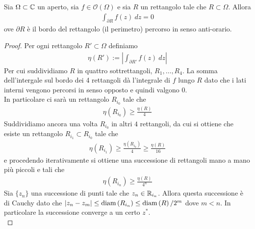 \begin{theorem}[di Goursat]
	\label{thr:groursat}
	Sia $\Omega \subset \mathbb{C}$ un aperto, sia $f \in \mathcal{O}(\Omega)$ e sia $R$ un rettangolo tale che $R \subset \Omega$. Allora 
	\begin{equation*}
	\begin{aligned}
		\int_{\partial R} f(z)\ dz = 0
	\end{aligned}
	\end{equation*}
	ove $\partial R$ è il bordo del rettangolo (il perimetro) percorso in senso anti-orario.
\end{theorem}
\begin{proof}
	Per ogni rettangolo $R' \subset \Omega$ definiamo 
	\begin{equation*}
	\begin{aligned}
		\eta(R') := \left| \int_{\partial R'} f(z)\ dz\right|
	\end{aligned}
	\end{equation*}
	Per cui suddividiamo $R$ in quattro sottrettangoli, $R_1, \dots, R_4$. La somma dell'intergale sul bordo dei 4 rettangoli dà l'integrale di $f$ lungo $R$ dato che i lati interni vengono percorsi in senso opposto e quindi valgono $0$. \\
	In particolare ci sarà un rettangolo $R_{i_0}$ tale che 
	\begin{equation*}
	\begin{aligned}	
		\eta(R_{i_0}) \ge \frac{\eta(R)}{4} 
	\end{aligned}
	\end{equation*}
	Suddividiamo ancora una volta $R_{i_0}$ in altri $4$ rettangoli, da cui si ottiene che esiste un rettangolo $R_{i_1} \subset R_{i_0}$ tale che 
	\begin{equation*}
	\begin{aligned}
		\eta(R_{i_1}) \ge \frac{\eta(R_{i_0})}{4} \ge \frac{\eta(R)}{16} 
	\end{aligned}
	\end{equation*}
	e procedendo iterativamente si ottiene una successione di rettangoli mano a mano più piccoli e tali che 
	\begin{equation*}
	\begin{aligned}	
		\eta(R_{i_n}) \ge \frac{\eta(R)}{4^n}
	\end{aligned}
	\end{equation*}
	Sia $\{z_n\}$ una successione di punti tale che $z_n \in \mathbb{R}_{i_n}$. Allora questa successione è di Cauchy dato che $|z_n - z_m| \le \operatorname{diam}\left(R_{i_n}\right) \le \operatorname{diam}\left(R\right)/2^m$ dove $m < n$. In particolare la successione converge a un certo $z^*$.\\

\end{proof}
